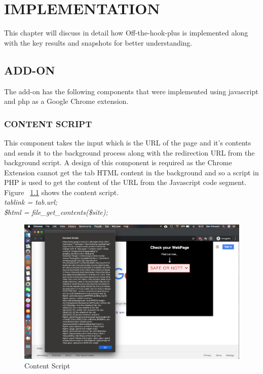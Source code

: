 
\chapter{IMPLEMENTATION} %
This chapter will discuss in detail how Off-the-hook-plus is implemented along with the key results and snapshots for better understanding.

\section{ADD-ON}
The add-on has the following components that were implemented using javascript and php as a Google Chrome extension.

\subsection{CONTENT SCRIPT}
This component takes the input which is the URL of the page and it’s contents and sends it to the background process along with the redirection URL from the background script. A design of this component is required as the Chrome Extension cannot get the tab HTML content in the background and so a script in PHP is used to get the content of the URL from the Javascript code segment. Figure ~\ref{fig:contentscript} shows the content script.\\
\null\quad\textit{tablink = tab.url;}\\
\null\quad\textit{\$html = file\_get\_contents(\$site);}\\

\begin{figure}[htp]
\centering
\includegraphics[scale=0.15]{Figures/image9.png}
\caption{Content Script}
\label{fig:contentscript}
\end{figure}

